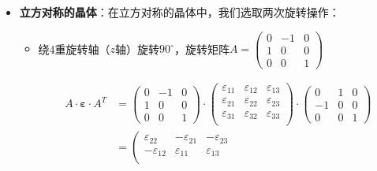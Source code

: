     \newpage
    \begin{itemize}[itemsep=0pt,parsep=0pt]
        \item \textbf{立方对称的晶体}：在立方对称的晶体中，我们选取两次旋转操作：
        \begin{itemize}[itemsep=0pt,parsep=0pt]
            \item 
            绕4重旋转轴（$z$轴）旋转$90^{\circ}$，旋转矩阵$
            A=
            \left(
            \begin{array}{ccc}
                0 & -1 & 0 \\
                1 & 0 & 0 \\
                0 & 0 & 1 
            \end{array}
            \right)
            $

            \begin{align*}
                A \cdot \boldsymbol{\varepsilon} \cdot A^{T}&=
                \left(
                \begin{array}{ccc}
                    0 & -1 & 0 \\
                    1 & 0 & 0 \\
                    0 & 0 & 1 
                \end{array}
                \right)
                \cdot
                \left(
                \begin{array}{ccc}
                    \varepsilon_{11} & \varepsilon_{12} & \varepsilon_{13} \\
                    \varepsilon_{21} & \varepsilon_{22} & \varepsilon_{23} \\
                    \varepsilon_{31} & \varepsilon_{32} & \varepsilon_{33} \\
                \end{array}
                \right)
                \cdot
                \left(
                \begin{array}{ccc}
                    0 & 1 & 0 \\
                    -1 & 0 & 0 \\
                    0 & 0 & 1 
                \end{array}
                \right)\\
                &=
                \left(
                \begin{array}{ccc}
                    \varepsilon_{22} & -\varepsilon_{21} & -\varepsilon_{23} \\
                    -\varepsilon_{12} & \varepsilon_{11} & \varepsilon_{13} \\

\end{array}
\end{align*}
\end{itemize}
\end{itemize}
